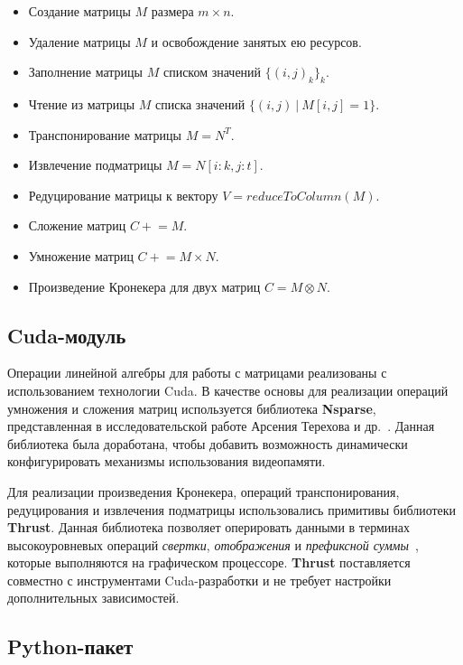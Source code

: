\begin{itemize}[noitemsep,topsep=0pt,parsep=0pt,partopsep=0pt]
    \item Создание матрицы $M$ размера $m \times n$.
    \item Удаление матрицы $M$ и освобождение занятых ею ресурсов.
    \item Заполнение матрицы $M$ списком значений $\{(i, j)_k\}_k$.
    \item Чтение из матрицы $M$ списка значений $\{(i, j)~|~M[i,j]=1\}$.
    \item Транспонирование матрицы $M = N^T$.
    \item Извлечение подматрицы $M = N[i:k, j:t]$.
    \item Редуцирование матрицы к вектору $V = \textit{reduceToColumn}(M)$.
    \item Сложение матриц $C \mathrel{+}= M$.
    \item Умножение матриц $C \mathrel{+}= M \times N$.
    \item Произведение Кронекера для двух матриц $C = M \otimes N$.
\end{itemize}

\subsection{Cuda-модуль}

Операции линейной алгебры для работы с матрицами реализованы с использованием технологии Cuda. 
В качестве основы для реализации операций умножения и сложения матриц используется библиотека \textbf{Nsparse}, представленная в исследовательской работе Арсения Терехова и др.~\cite{inproceedings:cfqp_matrix_with_single_source}.
Данная библиотека была доработана, чтобы добавить возможность динамически конфигурировать механизмы использования видеопамяти. 

Для реализации произведения Кронекера, операций транспонирования, редуцирования и извлечения подматрицы использовались примитивы библиотеки \textbf{Thrust}.
Данная библиотека позволяет оперировать данными в терминах высокоуровневых операций \textit{свертки}, \textit{отображения} и \textit{префиксной суммы}~\cite{net:cuda_thrust}, которые выполняются на графическом процессоре. 
\textbf{Thrust} поставляется совместно с инструментами Cuda-разработки и не требует настройки дополнительных зависимостей.

\subsection{Python-пакет}


